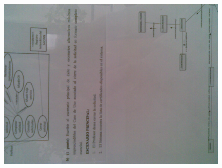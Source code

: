 \documentclass[12pt,a4paper]{report}
\begin{document}
\begin{figure}
  \includegraphics[width=\textwidth]{./images/jun/Imagen090.jpg}
\end{figure}



\printindex
\end{document}
